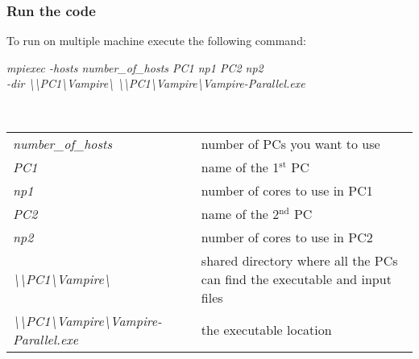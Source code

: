 \subsubsection{Run the code}
To run \vampire on multiple machine execute the following command:\\

\begin{minipage}[c]{\textwidth}
\centering
\textit{mpiexec -hosts number\_of\_hosts PC1 np1 PC2 np2\\
-dir \textbackslash\textbackslash PC1\textbackslash Vampire\textbackslash
\textbackslash\textbackslash PC1\textbackslash Vampire\textbackslash Vampire-Parallel.exe}
\end{minipage}\\

\begin{table}[!h]
\begin{center}
\lightfont
\begin{tabular}{p{4.5cm} p{4.5cm}}
\hline
\textit{number\_of\_hosts}        & number of PCs you want to use\\
\textit{PC1}                    & name of the 1$^{\mathrm{st}}$ PC\\
\textit{np1}                    & number of cores to use in PC1\\
\textit{PC2}                    & name of the 2$^{\mathrm{nd}}$ PC\\
\textit{np2}                    & number of cores to use in PC2\\
\textit{\textbackslash\textbackslash PC1\textbackslash Vampire\textbackslash} & shared directory where all the PCs can find the executable and input files\\
\textit{\textbackslash\textbackslash PC1\textbackslash Vampire\textbackslash Vampire-Parallel.exe} & the executable location\\
\hline
\end{tabular}
\end{center}
\end{table}


